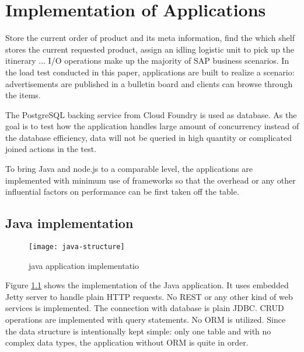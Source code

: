 \chapter{Implementation of Applications}
Store the current order of product and its meta information, find the which shelf stores the current requested product, assign an idling logistic unit to pick up the itinerary ... I/O operations make up the majority of SAP business scenarios. 
 In the load test conducted in this paper, applications are built to realize a scenario: advertisements are published in a bulletin board and clients can browse through the items. 

The PostgreSQL backing service from Cloud Foundry is used as database. As the goal is to test how the application handles large amount of concurrency instead of the database efficiency, data will not be queried in high quantity or complicated joined actions  in the test. 

To bring Java and node.js to a comparable level, the applications are implemented with minimum use of frameworks so that the overhead or any other influential factors on performance can be first taken off the table. 
\section{Java implementation}

\begin{figure}[h]
	\centering
	\texttt{[image: java-structure]}
	\caption{java application implementatio}
	\label{java-implementation}
\end{figure}

Figure \ref{java-implementation} shows the implementation of the Java application. It uses embedded Jetty server to handle plain HTTP requests. No REST or any other kind of web services is implemented. The connection with database is plain JDBC. CRUD operations are implemented with query statements. No ORM is utilized. Since the data structure is intentionally kept simple: only one table and with no complex data types, the application without ORM is quite in order.\\
